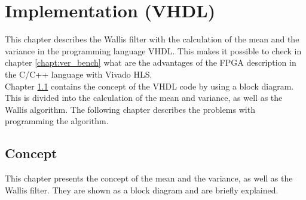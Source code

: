 \section{Implementation (VHDL)} \label{ch:ip:imp_vhdl}
This chapter describes the Wallis filter with the calculation of the mean and the variance in the programming language VHDL. This makes it possible to check in chapter \ref{chapt:ver_bench} what are the advantages of the FPGA description in the C/C++ language with Vivado HLS. \\
Chapter \ref{ch:concept_vhdl} contains the concept of the VHDL code by using a block diagram. This is divided into the calculation of the mean and variance, as well as the Wallis algorithm. The following chapter describes the problems with programming the algorithm.

\subsection{Concept} \label{ch:concept_vhdl}
This chapter presents the concept of the mean and the variance, as well as the Wallis filter. They are shown as a block diagram and are briefly explained.

